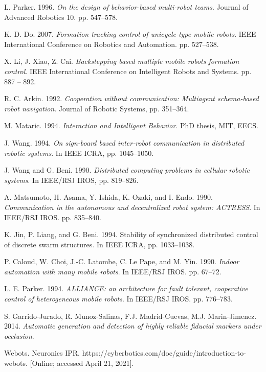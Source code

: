 \begin{thebibliography}{19}
L. Parker. 1996. \emph{On the design of behavior-based multi-robot teams}. Journal of Advanced Robotics 10. pp. 547–578.

K. D. Do. 2007. \emph{Formation tracking control of unicycle-type mobile robots}. IEEE International Conference on Robotics and Automation. pp. 527–538.

X. Li, J. Xiao, Z. Cai. \emph{Backstepping based multiple mobile robots formation control}. IEEE International Conference on Intelligent Robots and Systems. pp. 887 – 892.

R. C. Arkin. 1992. \emph{Cooperation without communication: Multiagent schema-based robot navigation}. Journal of Robotic Systems, pp. 351–364.

M. Mataric. 1994. \emph{Interaction and Intelligent Behavior}. PhD thesis, MIT, EECS.

J. Wang. 1994. \emph{On sign-board based inter-robot communication in distributed robotic systems}. In IEEE ICRA, pp. 1045–1050.

J. Wang and G. Beni. 1990. \emph{Distributed computing problems in cellular robotic systems}. In IEEE/RSJ IROS, pp. 819–826.

A. Matsumoto, H. Asama, Y. Ishida, K. Ozaki, and I. Endo. 1990. \emph{Communication in the autonomous and decentralized robot system: ACTRESS}. In IEEE/RSJ IROS. pp. 835–840.

K. Jin, P. Liang, and G. Beni. 1994. Stability of synchronized distributed control of discrete swarm structures. In IEEE ICRA, pp. 1033–1038.

P. Caloud, W. Choi, J.-C. Latombe, C. Le Pape, and M. Yin. 1990. \emph{Indoor automation with many mobile robots}. In IEEE/RSJ IROS. pp. 67–72.

L. E. Parker. 1994. \emph{ALLIANCE: an architecture for fault tolerant, cooperative control of heterogeneous mobile robots}. In IEEE/RSJ IROS. pp. 776–783.

S. Garrido-Jurado, R. Munoz-Salinas, F.J. Madrid-Cuevas, M.J. Marin-Jimenez. 2014. \emph{Automatic generation and detection of highly reliable 
fiducial markers under occlusion}.

Webots. Neuronics IPR. https://cyberbotics.com/doc/guide/introduction-to-webots. [Online; accessed April 21, 2021].

\end{thebibliography}
